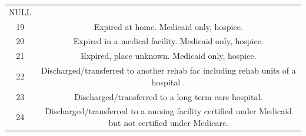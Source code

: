 \documentclass[]{article}
\begin{document}
\begin{itemize}
\begin{longtable}[c]{@{}cc@{}}
  \begin{minipage}[t]{0.41\columnwidth}\centering\strut
  NULL
  \strut\end{minipage}\tabularnewline
  \begin{minipage}[t]{0.35\columnwidth}\centering\strut
  19
  \strut\end{minipage} &
  \begin{minipage}[t]{0.41\columnwidth}\centering\strut
  Expired at home. Medicaid only, hospice.
  \strut\end{minipage}\tabularnewline
  \begin{minipage}[t]{0.35\columnwidth}\centering\strut
  20
  \strut\end{minipage} &
  \begin{minipage}[t]{0.41\columnwidth}\centering\strut
  Expired in a medical facility. Medicaid only, hospice.
  \strut\end{minipage}\tabularnewline
  \begin{minipage}[t]{0.35\columnwidth}\centering\strut
  21
  \strut\end{minipage} &
  \begin{minipage}[t]{0.41\columnwidth}\centering\strut
  Expired, place unknown. Medicaid only, hospice.
  \strut\end{minipage}\tabularnewline
  \begin{minipage}[t]{0.35\columnwidth}\centering\strut
  22
  \strut\end{minipage} &
  \begin{minipage}[t]{0.41\columnwidth}\centering\strut
  Discharged/transferred to another rehab fac including rehab units of a
  hospital .
  \strut\end{minipage}\tabularnewline
  \begin{minipage}[t]{0.35\columnwidth}\centering\strut
  23
  \strut\end{minipage} &
  \begin{minipage}[t]{0.41\columnwidth}\centering\strut
  Discharged/transferred to a long term care hospital.
  \strut\end{minipage}\tabularnewline
  \begin{minipage}[t]{0.35\columnwidth}\centering\strut
  24
  \strut\end{minipage} &
  \begin{minipage}[t]{0.41\columnwidth}\centering\strut
  Discharged/transferred to a nursing facility certified under Medicaid
  but not certified under Medicare.
  \strut\end{minipage}\tabularnewline

\end{longtable}
\end{itemize}
\end{document}

